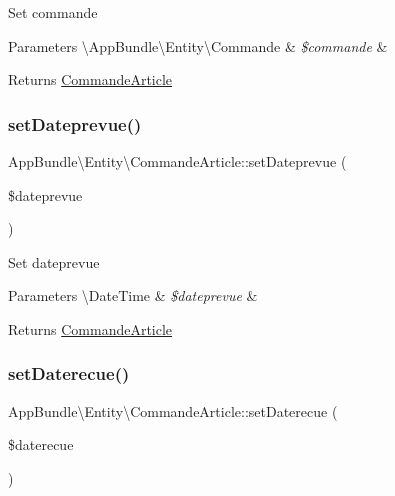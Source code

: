 Set commande


\begin{DoxyParams}[1]{Parameters}
\textbackslash{}\+App\+Bundle\textbackslash{}\+Entity\textbackslash{}\+Commande & {\em \$commande} & \\
\hline
\end{DoxyParams}
\begin{DoxyReturn}{Returns}
\hyperlink{class_app_bundle_1_1_entity_1_1_commande_article}{Commande\+Article} 
\end{DoxyReturn}
\mbox{\label{class_app_bundle_1_1_entity_1_1_commande_article_ab0f0bbfbd8ceeda0b346a7cf8f5eb8ad}} 
\subsubsection{\texorpdfstring{set\+Dateprevue()}{setDateprevue()}}
{\footnotesize\ttfamily App\+Bundle\textbackslash{}\+Entity\textbackslash{}\+Commande\+Article\+::set\+Dateprevue (\begin{DoxyParamCaption}\item[{}]{\$dateprevue }\end{DoxyParamCaption})}

Set dateprevue


\begin{DoxyParams}[1]{Parameters}
\textbackslash{}\+Date\+Time & {\em \$dateprevue} & \\
\hline
\end{DoxyParams}
\begin{DoxyReturn}{Returns}
\hyperlink{class_app_bundle_1_1_entity_1_1_commande_article}{Commande\+Article} 
\end{DoxyReturn}
\mbox{\label{class_app_bundle_1_1_entity_1_1_commande_article_a8a21189aac46a028a32a847e21a5cdd1}} 
\subsubsection{\texorpdfstring{set\+Daterecue()}{setDaterecue()}}
{\footnotesize\ttfamily App\+Bundle\textbackslash{}\+Entity\textbackslash{}\+Commande\+Article\+::set\+Daterecue (\begin{DoxyParamCaption}\item[{}]{\$daterecue }\end{DoxyParamCaption})}

